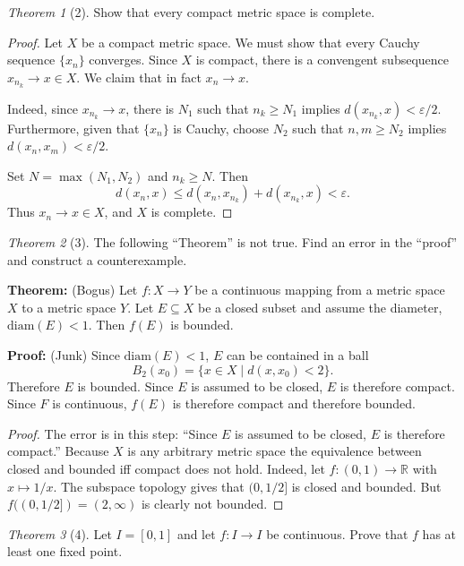 \documentclass[12pt]{article}
\theoremstyle{remark}
\theoremstyle{named}
\newtheorem*{theorem}{Theorem}
\newcommand{\e}{\varepsilon}
\newcommand{\R}{\mathbb R}
\begin{document}
\begin{theorem}[2]
    Show that every compact metric space is complete. 
\end{theorem}

\begin{proof}
    Let \(X\) be a compact metric space. We must show that every Cauchy sequence \(\{x_n\}\) converges. Since \(X\) is compact, there is a convengent subsequence \(x_{n_k} \to x \in X\). We claim that in fact \(x_n \to x\).

    Indeed, since \(x_{n_k} \to x\), there is \(N_1\) such that \(n_k \ge N_1\) implies \(d(x_{n_k}, x) < \e / 2\). Furthermore, given that \(\{x_n\}\) is Cauchy, choose \(N_2\) such that \(n, m \ge N_2\) implies \(d(x_n, x_m) < \e / 2\).

    Set \(N = \max(N_1, N_2)\) and \(n_k \ge N\). Then 
    \[d(x_n, x) \le d(x_n, x_{n_k}) + d(x_{n_k}, x) < \e.\]
    Thus \(x_n \to x \in X\), and \(X\) is complete.
\end{proof}

\begin{theorem}[3]
    The following ``Theorem'' is not true. Find an error in the ``proof'' and construct a counterexample.

    \textbf{Theorem:} (Bogus) Let \(f : X \to Y\) be a continuous mapping from a metric space \(X\) to a metric space \(Y\). Let \(E \subseteq X\) be a closed subset and assume the diameter, \(\text{diam}(E) < 1\). Then \(f(E)\) is bounded. 

    \textbf{Proof:} (Junk) Since \(\text{diam}(E) < 1\), \(E\) can be contained in a ball \[B_2(x_0) = \{x \in X \mid d(x, x_0) < 2\}.\]
    Therefore \(E\) is bounded. Since \(E\) is assumed to be closed, \(E\) is therefore compact. Since \(F\) is continuous, \(f(E)\) is therefore compact and therefore bounded. 
\end{theorem}

\begin{proof}
    The error is in this step: ``Since \(E\) is assumed to be closed, \(E\) is therefore compact.'' Because \(X\) is any arbitrary metric space the equivalence between closed and bounded iff compact does not hold. Indeed, let \(f : (0, 1) \to \R\) with \(x \mapsto 1 / x\). The subspace topology gives that \((0, 1/2]\) is closed and bounded. But \(f((0, 1/2]) = (2, \infty)\) is clearly not bounded. 
\end{proof}

\begin{theorem}[4]
    Let \(I = [0, 1]\) and let \(f : I \to I\) be continuous. Prove that \(f\) has at least one fixed point.
\end{theorem}
\end{document}
